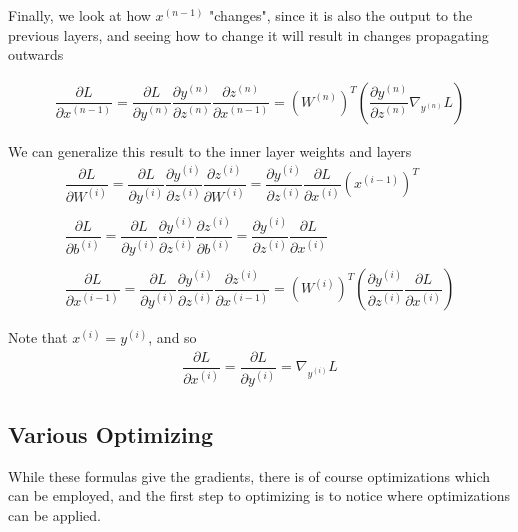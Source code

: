\documentclass{article}
\begin{document}
	Finally, we look at how \( x^{(n - 1)} \) "changes", since it is also the output to the previous layers, and seeing how to change it will result in changes propagating outwards
	
	\begin{gather*}
		\dfrac{\partial L}{\partial x^{(n - 1)}} = \dfrac{\partial L}{\partial y^{(n)}} \dfrac{\partial y^{(n)}}{\partial z^{(n)}} \dfrac{\partial z^{(n)}}{\partial x^{(n - 1)}} = \left( W^{(n)} \right)^T \left( \dfrac{\partial y^{(n)}}{\partial z^{(n)}} \nabla_{y^{(n)}}L  \right)
	\end{gather*}
	
	We can generalize this result to the inner layer weights and layers
	\begin{gather*}
		\dfrac{\partial L}{\partial W^{(i)}} = \dfrac{\partial L}{\partial y^{(i)}} \dfrac{\partial y^{(i)}}{\partial z^{(i)}} \dfrac{\partial z^{(i)}}{\partial W^{(i)}} =	
		\dfrac{\partial y^{(i)}}{\partial z^{(i)}} \dfrac{\partial L}{\partial x^{(i)}} \left( x^{(i - 1)} \right)^T  \\ \\		
		\dfrac{\partial L}{\partial b^{(i)}} = \dfrac{\partial L}{\partial y^{(i)}} \dfrac{\partial y^{(i)}}{\partial z^{(i)}} \dfrac{\partial z^{(i)}}{\partial b^{(i)}} = \dfrac{\partial y^{(i)}}{\partial z^{(i)}} \dfrac{\partial L}{\partial x^{(i)}} \\ \\
		\dfrac{\partial L}{\partial x^{(i - 1)}} = \dfrac{\partial L}{\partial y^{(i)}} \dfrac{\partial y^{(i)}}{\partial z^{(i)}} \dfrac{\partial z^{(i)}}{\partial x^{(i - 1)}} = \left( W^{(i)} \right)^T \left( \dfrac{\partial y^{(i)}}{\partial z^{(i)}} \dfrac{\partial L}{\partial x^{(i)}} \right) 
	\end{gather*}
	
	Note that \( x^{(i)} = y^{(i)} \), and so
	\begin{gather*}
		\dfrac{\partial L}{\partial x^{(i)}} = \dfrac{\partial L}{\partial y^{(i)}} = \nabla_{y^{(i)}} L
	\end{gather*}
	
	\subsection{Various Optimizing}
	While these formulas give the gradients, there is of course optimizations which can be employed, and the first step to optimizing is to notice where optimizations can be applied.
	
\end{document}
